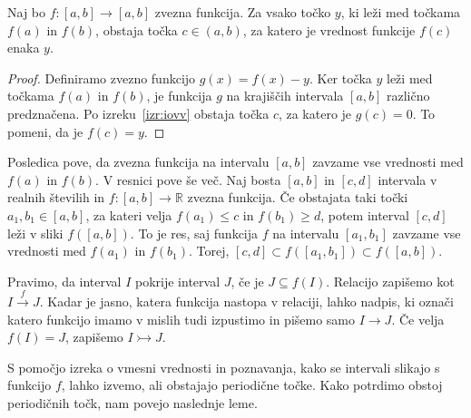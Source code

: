 \documentclass[mat2]{fmfdelo}
\newcommand{\R}{\mathbb R}
\begin{document}
\begin{posledica}\label{pos:vmesnavrednost}
Naj bo $f : [a, b] \to [a, b]$ zvezna funkcija. Za vsako točko $y$, ki leži med točkama $f(a)$ in $f(b)$, obstaja točka $c \in (a, b)$, za katero je vrednost funkcije $f(c)$ enaka $y$.
\end{posledica}
\begin{proof}
Definiramo zvezno funkcijo $g(x) = f(x) - y$. Ker točka $y$ leži med točkama $f(a)$ in $f(b)$, je funkcija $g$ na krajiščih intervala $[a, b]$ različno predznačena. Po izreku~\ref{izr:iovv} obstaja točka $c$, za katero je $g(c) = 0$. To pomeni, da je $f(c) = y$.
\end{proof}
Posledica pove, da zvezna funkcija na intervalu $[a, b]$ zavzame vse vrednosti med $f(a)$ in $f(b)$. V resnici pove še več. Naj bosta $[a, b]$ in $[c, d]$ intervala v realnih številih in $f : [a, b] \to \R$ zvezna funkcija. Če obstajata taki točki $a_1, b_1 \in [a, b]$, za kateri velja $f(a_1) \leq c$ in $f(b_1) \geq d$, potem interval $[c, d]$ leži v sliki $f([a, b])$. To je res, saj funkcija $f$ na intervalu $[a_1, b_1]$ zavzame vse vrednosti med $f(a_1)$ in $f(b_1)$. Torej, $[c, d] \subset f([a_1, b_1]) \subset f([a, b])$.

\begin{definicija}\label{def:pokritja}
Pravimo, da interval $I$ pokrije interval $J$, če je $J \subseteq f(I)$. Relacijo zapišemo kot $I \xrightarrow{f} J$. Kadar je jasno, katera funkcija nastopa v relaciji, lahko nadpis, ki označi katero funkcijo imamo v mislih tudi izpustimo in pišemo samo $I \to J$. Če velja $f(I) =J$, zapišemo $I \rightarrowtail J$.
\end{definicija}
S pomočjo izreka o vmesni vrednosti in poznavanja, kako se intervali slikajo s funkcijo $f$, lahko izvemo, ali obstajajo periodične točke. Kako potrdimo obstoj periodičnih točk, nam povejo naslednje leme.
\end{document}
